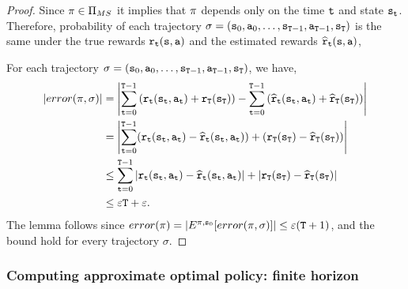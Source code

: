 \begin{proof}
Since $\pi\in  {\Pi _{MS}}$ it implies that $\pi$ depends
only on the time ${\tt t}$ and state ${\tt s}_{\tt t}$.
%
Therefore, probability of each trajectory
$\sigma=({\tt s}_0,{\tt a}_0,\ldots,
{\tt s}_{{\tt T}-1},{\tt a}_{{\tt T}-1},{\tt s}_{\tt T})$ is the
same under the true rewards ${\tt r}_{\tt t}({\tt s},{\tt a})$ and the
estimated rewards $\widehat{{\tt r}}_{\tt t}({\tt s},{\tt a})$,

For each trajectory $\sigma=({\tt s}_0,{\tt a}_0,\ldots,
{\tt s}_{{\tt T}-1},{\tt a}_{{\tt T}-1},{\tt s}_{\tt T})$, we
have,
\begin{align*}
\left|error(\pi,\sigma)\right| &= \left|\sum_{{\tt t}=0}^{{\tt T}-1}
\left({\tt r}_{\tt t}({\tt s}_{\tt t},{\tt a}_{\tt t})+{\tt r}_{\tt T}({\tt s}_{\tt T})\right)
-\sum_{{\tt t}=0}^{{\tt T}-1}
\left(\widehat{{\tt r}}_{\tt t}({\tt s}_{\tt t},{\tt a}_{\tt t})+\widehat{{\tt r}}_{\tt T}({\tt s}_{\tt T})\right)\right| \\
&= \left|\sum_{{\tt t}=0}^{{\tt T}-1}
({\tt r}_{\tt t}({\tt s}_{\tt t},{\tt a}_{\tt t})-\widehat{{\tt r}}_{\tt t}({\tt s}_{\tt t},{\tt a}_{\tt t}))
+
({\tt r}_{\tt T}({\tt s}_{\tt T})-\widehat{{\tt r}}_{\tt T}({\tt s}_{\tt T}))\right|\\
&\leq \sum_{{\tt t}=0}^{{\tt T}-1}
|{\tt r}_{\tt t}({\tt s}_{\tt t},{\tt a}_{\tt t})-\widehat{{\tt r}}_{\tt t}({\tt s}_{\tt t},{\tt a}_{\tt t})|
+
|{\tt r}_{\tt T}({\tt s}_{\tt T})-\widehat{{\tt r}}_{\tt T}({\tt s}_{\tt T})|\\
&\leq \varepsilon {\tt T} +\varepsilon .
\end{align*}
The lemma follows since
$error(\pi)=|E^{\pi,{\tt s}_0}[error(\pi,\sigma)]|\leq
\varepsilon({\tt T}+1)$, and the bound hold for every trajectory
$\sigma$.
\end{proof}

\subsubsection{Computing approximate optimal policy: finite horizon}

